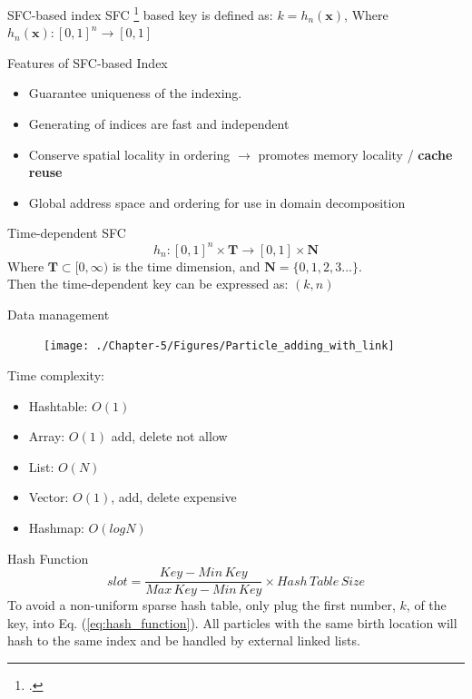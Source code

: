 \documentclass{beamer}
\begin{document}
\begin{frame}{SFC-based index}
SFC \footcite{sagan2012space} based key is defined as: $k = h_n (\textbf{x})$, Where $h_n (\textbf{x}): [0,1]^n \rightarrow [0,1]$
\begin{block}{Features of SFC-based Index}
  \begin{itemize}
  \item {
    Guarantee uniqueness of the indexing.
  }
  \item {
    Generating of indices are fast and
independent
  }
  \item {
    Conserve spatial locality in ordering $\rightarrow$ promotes memory locality / {\bf cache reuse}
  }
  \item {
    Global address space and ordering for use in  domain decomposition
  }
  \end{itemize}
\end{block}

\begin{block}{Time-dependent SFC}
\begin{equation}
h_n: [0,1]^n \times \textbf{T} \rightarrow [0,1] \times \textbf{N}
\end{equation}
Where $\textbf{T} \subset [0,\infty)$ is the time dimension, and $\textbf{N}=\lbrace 0, 1, 2, 3...\rbrace$. \\
Then the time-dependent key can be expressed as: $(k,n)$
\end{block}
\end{frame}

\begin{frame}{Data management}
\begin{minipage}{0.66 \textwidth}
\begin{figure}
\texttt{[image: ./Chapter-5/Figures/Particle\_adding\_with\_link]}
\end{figure}
\end{minipage}
\begin{minipage}{0.33 \textwidth} 
\small
Time complexity: 

\begin{itemize}
\item Hashtable: $O(1)$
\item Array: $O(1)$ add, delete not allow
\item List: $O(N)$
\item Vector: $O(1)$, add, delete expensive
\item Hashmap: $O(logN)$
\end{itemize}

\end{minipage}
\small
\begin{block}{Hash Function}
\begin{equation}
slot= \frac{Key - Min\,Key}{Max\,Key - Min\,Key} 
\times Hash\,Table\,Size 
\label{eq:hash_function}
\end{equation}
To avoid a non-uniform sparse hash table, only plug the first number, $k$, of the key, into Eq. (\ref{eq:hash_function}). All particles with the same birth location will hash to the same index and be handled by external linked lists.
\end{block}
\end{frame}
\end{document}
